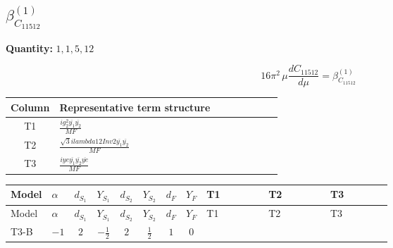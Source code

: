 \documentclass[8pt]{article}
\begin{document}
\begin{landscape}
\section*{$\beta_{C_{11512}}^{(1)}$}
\noindent\textbf{Quantity: }$\mathrm{1,1,5,12}$\par\smallskip
\[16\pi^2\,\mu\frac{d C_{11512}}{d\mu}=\beta_{C_{11512}}^{(1)}\]
\begin{center}
\begin{tabular}{@{}c >{\raggedright\arraybackslash}p{0.82\linewidth}@{}}
\toprule
Column & Representative term structure \\
\midrule
T1 & \(\displaystyle \frac{i g_{2}^{2} \overline{y_{1}} \overline{y_{2}}}{MF}\) \\
\midrule
T2 & \(\displaystyle \frac{\sqrt{3} i lambda12Inv2 \overline{y_{1}} \overline{y_{2}}}{MF}\) \\
\midrule
T3 & \(\displaystyle \frac{i ye \overline{y_{1}} \overline{y_{2}} \overline{ye}}{MF}\) \\
\midrule
\bottomrule
\end{tabular}
\end{center}
\smallskip
\tiny
\begin{longtable}{@{}llcccccc >{\raggedright\arraybackslash}p{0.21\linewidth} >{\raggedright\arraybackslash}p{0.21\linewidth} >{\raggedright\arraybackslash}p{0.21\linewidth}@{}}
\toprule
Model & $\alpha$ & $d_{S_1}$ & $Y_{S_1}$ & $d_{S_2}$ & $Y_{S_2}$ & $d_F$ & $Y_F$ & T1 & T2 & T3 \\
\midrule
\endfirsthead
\toprule
Model & $\alpha$ & $d_{S_1}$ & $Y_{S_1}$ & $d_{S_2}$ & $Y_{S_2}$ & $d_F$ & $Y_F$ & T1 & T2 & T3 \\
\midrule
\endhead
T3-B & $-1$ & $2$ & $-\frac{1}{2}$ & $2$ & $\frac{1}{2}$ & $1$ & $0$ & \scriptsize\adjustbox{max width=\linewidth}{$\begin{gathered} - \frac{3 i g_{2}^{2} \overline{y_{1}} \overline{y_{2}}}{4 MF}\end{gathered}$} & \scriptsize\adjustbox{max width=\linewidth}{$\begin{gathered} - \frac{\sqrt{3} i lambda12Inv2 \overline{y_{1}} \overline{y_{2}}}{3 MF}\end{gathered}$} & \scriptsize\adjustbox{max width=\linewidth}{$\begin{gathered} \frac{i ye \overline{y_{1}} \overline{y_{2}} \overline{ye}}{4 MF}\end{gathered}$} \\
\midrule
\bottomrule
\end{longtable}
\clearpage

\end{landscape}
\end{document}
